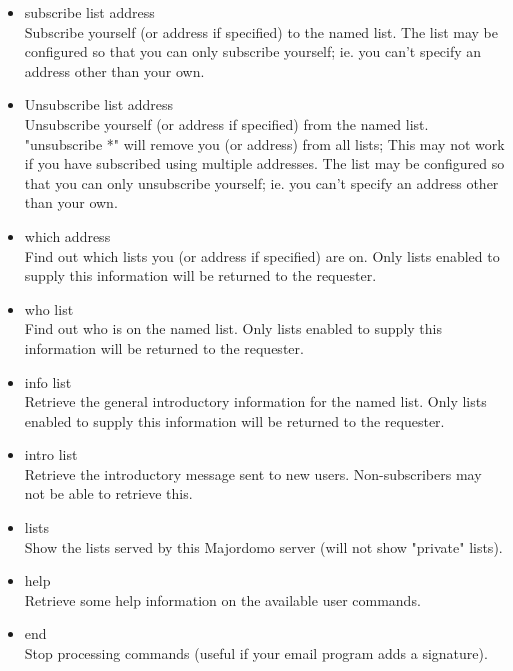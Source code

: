 \begin{itemize}
   \item subscribe list address \\
       Subscribe yourself (or address if specified) to the named list. The list may be 
       configured so that you can only subscribe yourself; ie. you can't specify an 
       address other than your own.

   \item Unsubscribe list address \\
    Unsubscribe yourself (or address if specified) from the named list. "unsubscribe *" 
    will remove you (or address) from all lists; This may not work if you have subscribed 
    using multiple addresses. The list may be configured so that you can only unsubscribe 
    yourself; ie. you can't specify an address other than your own.

   \item which address \\
    Find out which lists you (or address if specified) are on. Only lists enabled to
    supply this information will be returned to the requester.

   \item who list \\
    Find out who is on the named list. Only lists enabled to supply this information 
    will be returned to the requester.

   \item info list \\
    Retrieve the general introductory information for the named list. Only lists enabled
    to supply this information will be returned to the requester.

   \item intro list \\
    Retrieve the introductory message sent to new users. Non-subscribers may not be able
    to retrieve this.

   \item lists \\
    Show the lists served by this Majordomo server (will not show "private" lists).

   \item help \\
    Retrieve some help information on the available user commands.

   \item end \\
    Stop processing commands (useful if your email program adds a signature). 
\end{itemize}


